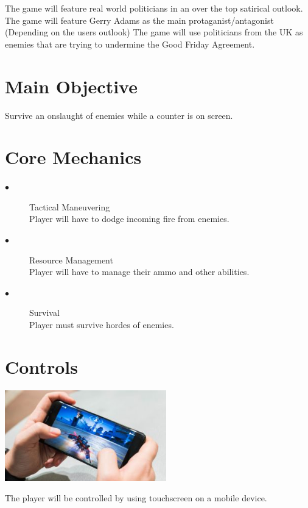 \documentclass[a4paper]{scrreprt}
\begin{document}
    The game will feature real world politicians in an over the top satirical outlook.
    The game will feature Gerry Adams as the main protaganist/antagonist (Depending on the users outlook)
    The game will use politicians from the UK as enemies that are trying to undermine the Good Friday Agreement.

    \section{Main Objective}

    Survive an onslaught of enemies while a counter is on screen.

    \section{Core Mechanics}

    \begin{description}
        \item[$\bullet$] Tactical Maneuvering \\
        Player will have to dodge incoming fire from enemies.
        \item[$\bullet$] Resource Management \\
        Player will have to manage their ammo and other abilities.
        \item[$\bullet$] Survival \\
        Player must survive hordes of enemies.
    \end{description}

    \section{Controls}

    \begin{center}
        \includegraphics[width=7cm]{mobile}
    \end{center}

    The player will be controlled by using touchscreen on a mobile device.
\end{document}

